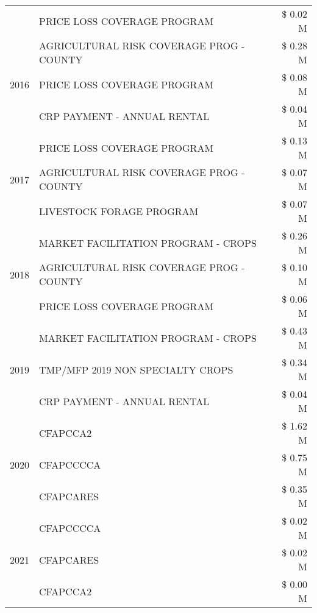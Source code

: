\begin{tabular}{llr}
 & PRICE LOSS COVERAGE PROGRAM & \$ 0.02 M \\
\cline{1-3}
\multirow[t]{3}{*}{2016} & AGRICULTURAL RISK COVERAGE PROG - COUNTY      & \$ 0.28 M \\
 & PRICE LOSS COVERAGE PROGRAM                   & \$ 0.08 M \\
 & CRP PAYMENT - ANNUAL RENTAL                   & \$ 0.04 M \\
\cline{1-3}
\multirow[t]{3}{*}{2017} & PRICE LOSS COVERAGE PROGRAM & \$ 0.13 M \\
 & AGRICULTURAL RISK COVERAGE PROG - COUNTY & \$ 0.07 M \\
 & LIVESTOCK FORAGE PROGRAM & \$ 0.07 M \\
\cline{1-3}
\multirow[t]{3}{*}{2018} & MARKET FACILITATION PROGRAM - CROPS & \$ 0.26 M \\
 & AGRICULTURAL RISK COVERAGE PROG - COUNTY & \$ 0.10 M \\
 & PRICE LOSS COVERAGE PROGRAM & \$ 0.06 M \\
\cline{1-3}
\multirow[t]{3}{*}{2019} & MARKET FACILITATION PROGRAM - CROPS & \$ 0.43 M \\
 & TMP/MFP 2019 NON SPECIALTY CROPS & \$ 0.34 M \\
 & CRP PAYMENT - ANNUAL RENTAL & \$ 0.04 M \\
\cline{1-3}
\multirow[t]{3}{*}{2020} & CFAPCCA2 & \$ 1.62 M \\
 & CFAPCCCCA & \$ 0.75 M \\
 & CFAPCARES & \$ 0.35 M \\
\cline{1-3}
\multirow[t]{3}{*}{2021} & CFAPCCCCA & \$ 0.02 M \\
 & CFAPCARES & \$ 0.02 M \\
 & CFAPCCA2 & \$ 0.00 M \\
\cline{1-3}
\bottomrule
\end{tabular}
